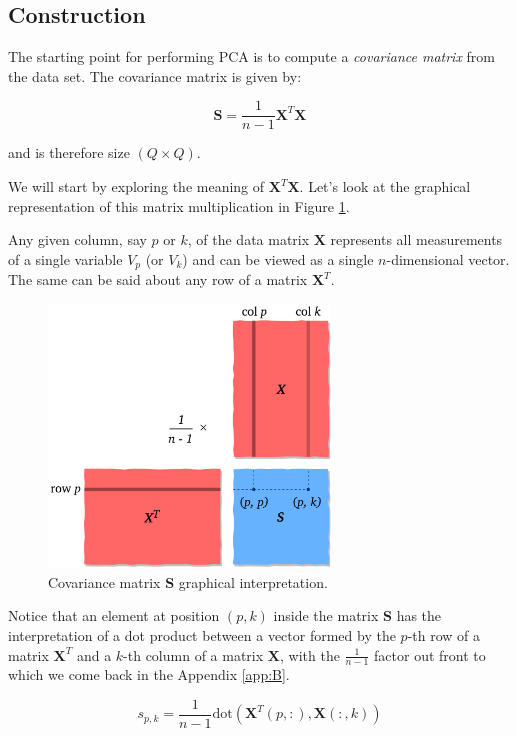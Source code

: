 \documentclass[10pt,twocolumn]{article}
\begin{document}
\subsection{Construction}

The starting point for performing PCA is to compute a \textit{covariance matrix} from the data set. The covariance matrix is given by:

\begin{equation}
\bm{S} = \frac{1}{n-1} \bm{X}^T \bm{X}
\end{equation}

and is therefore size $(Q \times Q)$.

We will start by exploring the meaning of $\bm{X}^T \bm{X}$. Let's look at the graphical representation of this matrix multiplication in Figure \ref{fig:covariance-matrix}.

Any given column, say $p$ or $k$, of the data matrix $\bm{X}$ represents all measurements of a single variable $V_p$ (or $V_k$) and can be viewed as a single $n$-dimensional vector. The same can be said about any row of a matrix $\bm{X}^T$.

\begin{figure}[H]
\centering\includegraphics[width=7.5cm]{cov-matrix.png}
\caption{Covariance matrix $\bm{S}$ graphical interpretation.}
\label{fig:covariance-matrix}
\end{figure}

Notice that an element at position $(p,k)$ inside the matrix $\bm{S}$ has the interpretation of a dot product between a vector formed by the $p$-th row of a matrix $\bm{X}^T$ and a $k$-th column of a matrix $\bm{X}$, with the $\frac{1}{n-1}$ factor out front to which we come back in the Appendix \ref{app:B}.

\begin{equation}
s_{p,k} = \frac{1}{n-1} \text{dot}( \bm{X}^T(p, :), \bm{X}(:,k))
\end{equation}
\end{document}
